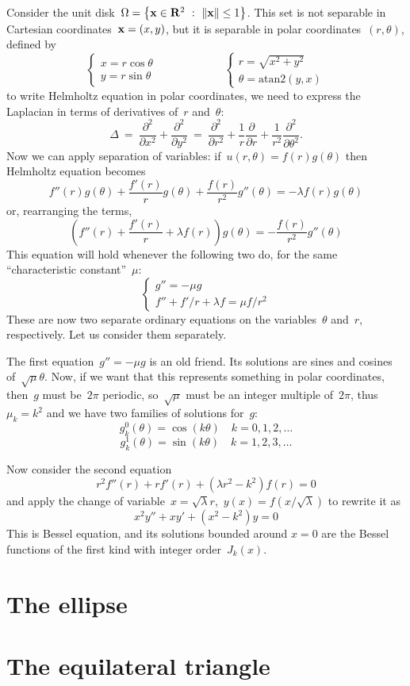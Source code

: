 Consider the unit disk~$\Omega=\left\{\mathbf{x}\in\mathbf{R}^2\ :\
\|\mathbf{x}\|\le1\right\}$.  This set is not separable in Cartesian
coordinates~$\mathbf{x}=(x,y)$, but it is separable in polar
coordinates~$(r,\theta)$, defined by
\[
	\begin{cases}
		x = r\cos\theta \\
		y = r\sin\theta
	\end{cases}
	\qquad\qquad
	\qquad
	\begin{cases}
		r = \sqrt{x^2+y^2} \\
		\theta = \mathrm{atan2}(y,x)
	\end{cases}
\]
to write Helmholtz equation in polar coordinates, we need to
express the Laplacian in terms of derivatives of~$r$ and~$\theta$:
\[
	\Delta
	\ = \ %
	\frac{\partial^2}{\partial x^2}
	+
	\frac{\partial^2}{\partial y^2}
	\ = \ %
	\frac{\partial^2}{\partial r^2}
	+
	\frac 1r
	\frac{\partial}{\partial r}
	+
	\frac 1{r^2}
	\frac{\partial^2}{\partial \theta^2}.
\]
Now we can apply separation of variables:
if~$u(r,\theta)=f(r)g(\theta)$ then Helmholtz equation becomes
\[%
f''(r)g(\theta)+\frac{f'(r)}rg(\theta)+\frac{f(r)}{r^2}g''(\theta)
=-\lambda f(r)g(\theta)
\]
or, rearranging the terms,
\[
	\left(
f''(r)
+
\frac{f'(r)}r
+\lambda f(r)
\right)g(\theta)
=
-
\frac{f(r)}{r^2}g''(\theta)
\]
This equation will hold whenever the following two do, for the same
``characteristic constant''~$\mu$:
\[
	\begin{cases}
		g''=-\mu g \\
		f''+{f'}/{r}+\lambda f = \mu{f}/{r^2}
	\end{cases}
\]
These are now two separate ordinary equations on the
variables~$\theta$ and~$r$, respectively.  Let us consider them
separately.

The first equation~$g''=-\mu g$ is an old friend.  Its solutions are
sines and cosines of~$\sqrt{\mu}\theta$.  Now, if we want that this
represents something in polar coordinates, then~$g$ must be~$2\pi$
periodic, so~$\sqrt{\mu}$ must be an integer multiple of~$2\pi$,
thus~$\mu_k=k^2$ and we have two families of solutions
for~$g$:
\[
	g^0_k(\theta) = \cos(k \theta)
	\quad k=0,1,2,\ldots
\]
\[
	g^1_k(\theta) = \sin(k \theta)
	\quad k=1,2,3,\ldots
\]

Now consider the second equation
\[
	r^2f''(r) + rf'(r)
	+\left(\lambda r^2
		-
	k^2
	\right)f(r) = 0
\]
and apply the change of variable~$x=\sqrt\lambda
r$,~$y(x)=f\left(x/\sqrt\lambda\right)$ to rewrite it as
\[
		x^2y''+xy'+\left(x^2-
	k^2\right)y=0
\]
This is Bessel equation, and its solutions bounded around $x=0$ are
the Bessel functions of the first kind with integer order~$J_k(x)$.

\section{The ellipse}

\section{The equilateral triangle}

